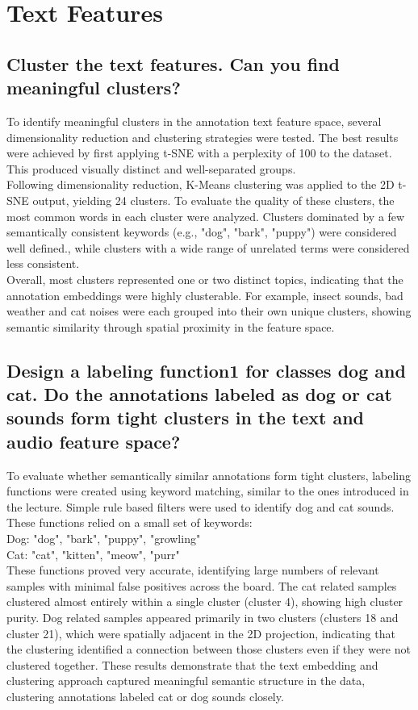 
\section{Text Features}
\label{sec:Text Features}


\subsection{Cluster the text features. Can you find meaningful clusters?}
\label{sec:Text Features:a}
To identify meaningful clusters in the annotation text feature space, several dimensionality reduction and clustering strategies were tested. The best results were achieved by first applying t-SNE with a perplexity of 100 to the dataset. This produced visually distinct and well-separated groups. \\
Following dimensionality reduction, K-Means clustering was applied to the 2D t-SNE output, yielding 24 clusters. To evaluate the quality of these clusters, the most common words in each cluster were analyzed. Clusters dominated by a few semantically consistent keywords (e.g., "dog", "bark", "puppy") were considered well defined., while clusters with a wide range of unrelated terms were considered less consistent. \\
Overall, most clusters represented one or two distinct topics, indicating that the annotation embeddings were highly clusterable. For example, insect sounds, bad weather and cat noises were each grouped into their own unique clusters, showing semantic similarity through spatial proximity in the feature space.


\subsection{Design a labeling function1 for classes dog and cat. Do the annotations labeled as dog or cat sounds
form tight clusters in the text and audio feature space?}
\label{sec:Text Features:b}

To evaluate whether semantically similar annotations form tight clusters, labeling functions were created using keyword matching, similar to the ones introduced in the lecture. Simple rule based filters were used to identify dog and cat sounds. These functions relied on a small set of keywords:\\
Dog: "dog", "bark", "puppy", "growling"\\
Cat: "cat", "kitten", "meow", "purr"\\
These functions proved very accurate, identifying large numbers of relevant samples with minimal false positives across the board. The cat related samples clustered almost entirely within a single cluster (cluster 4), showing high cluster purity. Dog related samples appeared primarily in two clusters (clusters 18 and cluster 21), which were spatially adjacent in the 2D projection, indicating that the clustering identified a connection between those clusters even if they were not clustered together.
These results demonstrate that the text embedding and clustering approach captured meaningful semantic structure in the data, clustering annotations labeled cat or dog sounds closely.


